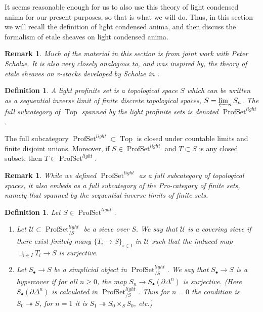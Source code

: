 \documentclass[12pt]{article}
\newtheorem{definition}[theorem]{Definition}
\newtheorem{remark}[theorem]{Remark}
\newcommand{\on}{\operatorname}
\begin{document}
It seems reasonable enough for us to also use this theory of light condensed anima for our present purposes, so that is what we will do.  Thus, in this section we will recall the definition of light condensed anima, and then discuss the formalism of etale sheaves on light condensed anima.

\begin{remark}
Much of the material in this section is from joint work with Peter Scholze.  It is also very closely analogous to, and was inspired by, the theory of etale sheaves on v-stacks developed by Scholze in \cite{ScholzeDiamonds}.
\end{remark}

\begin{definition}
A \emph{light profinite set} is a topological space $S$ which can be written as a sequential inverse limit of finite discrete topological spaces, $S=\varprojlim_n S_n$.  The full subcategory of $\on{Top}$ spanned by the light profinite sets is denoted $\on{ProfSet}^{light}$.
\end{definition}
The full subcategory $\on{ProfSet}^{light}\subset \on{Top}$ is closed under countable limits and finite disjoint unions.  Moreover, if $S\in \on{ProfSet}^{light}$ and $T\subset S$ is any closed subset, then $T\in\on{ProfSet}^{light}$. 

\begin{remark}
While we defined $\on{ProfSet}^{light}$ as a full subcategory of topological spaces, it also embeds as a full subcategory of the Pro-category of finite sets, namely that spanned by the sequential inverse limits of finite sets.
\end{remark}


\begin{definition}
Let $S\in\on{ProfSet}^{light}$.
\begin{enumerate}
\item  Let $\mathcal{U}\subset \on{ProfSet}^{light}_{/S}$ be a sieve over $S$.  We say that $\mathcal{U}$ is a covering sieve if there exist finitely many $\{T_i\rightarrow S\}_{i\in I}$ in $\mathcal{U}$ such that the induced map $\sqcup_{i\in I} T_i\rightarrow S$ is surjective.
\item Let $S_\bullet \rightarrow S$ be a simplicial object in $\on{ProfSet}^{light}_{/S}$.  We say that $S_\bullet \rightarrow S$ is a \emph{hypercover} if for all $n\geq 0$, the map $S_n\rightarrow S_\bullet(\partial \Delta^n)$ is surjective.  (Here $S_\bullet(\partial \Delta^n)$ is calculated in $\on{ProfSet}^{light}_{/S}$.  Thus for $n=0$ the condition is $S_0\twoheadrightarrow S$, for $n=1$ it is $S_1\twoheadrightarrow S_0\times_S S_0$, etc.)
\end{enumerate}
\end{definition}
\end{document}
